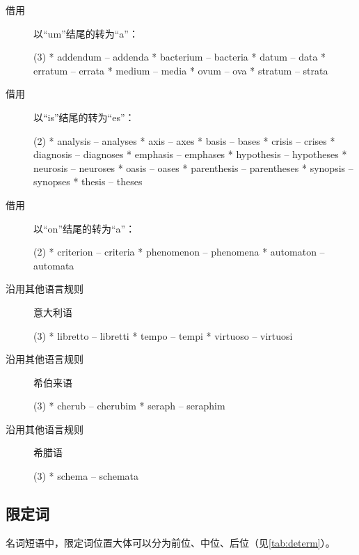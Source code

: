 \begin{description}
\item[借用] 以``um''结尾的转为``a''：
  \begin{taskitem}(3)
    *  addendum -- addenda
    *  bacterium -- bacteria
    *  datum -- data
    *  erratum -- errata
    *  medium -- media
    *  ovum -- ova
    *  stratum -- strata
  \end{taskitem}


\item[借用] 以``is''结尾的转为``es''：
  \begin{taskitem}(2)
    *  analysis -- analyses
    *  axis -- axes
    *  basis -- bases
    *  crisis -- crises
    *  diagnosis -- diagnoses
    *  emphasis -- emphases
    *  hypothesis -- hypotheses
    *  neurosis -- neuroses
    *  oasis -- oases
    *  parenthesis -- parentheses
    *  synopsis -- synopses
    *  thesis -- theses
  \end{taskitem}


\item[借用] 以``on''结尾的转为``a''：
  \begin{taskitem}(2)
    *  criterion -- criteria
    *  phenomenon -- phenomena
    *  automaton -- automata
  \end{taskitem}


\item[沿用其他语言规则] 意大利语
  \begin{taskitem}(3)
    *  libretto -- libretti
    *  tempo -- tempi
    *  virtuoso -- virtuosi
  \end{taskitem}

\item[沿用其他语言规则] 希伯来语
  \begin{taskitem}(3)
    *  cherub -- cherubim
    *  seraph -- seraphim
  \end{taskitem}

\item[沿用其他语言规则] 希腊语
  \begin{taskitem}(3)
    *  schema -- schemata
  \end{taskitem}
\end{description}

\subsection{限定词}

名词短语中，限定词位置大体可以分为前位、中位、后位（见\cref{tab:determ}）。

